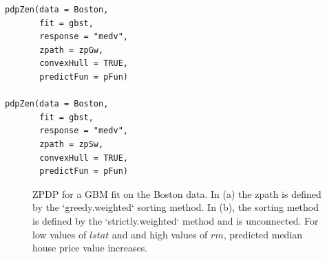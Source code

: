 \begin{verbatim}
pdpZen(data = Boston,
       fit = gbst,
       response = "medv",
       zpath = zpGw,
       convexHull = TRUE,
       predictFun = pFun) 

pdpZen(data = Boston,
       fit = gbst,
       response = "medv",
       zpath = zpSw,
       convexHull = TRUE,
       predictFun = pFun)
\end{verbatim}

\begin{figure}

{\centering {}

}

\caption{ZPDP for a GBM fit on the Boston data. In (a) the zpath is defined by the `greedy.weighted` sorting method. In (b), the sorting method is defined by the `strictly.weighted` method and is unconnected. For low values of $lstat$ and and high values of $rm$, predicted median house price value increases.}\label{fig:zpdpGBM}
\end{figure}

